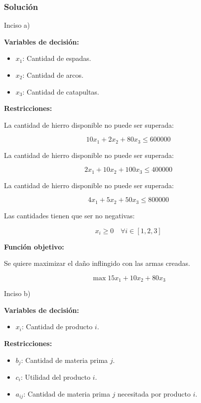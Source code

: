 \documentclass[a4paper,10pt,twocolumn]{article}
\theoremstyle{theorem}
\theoremstyle{definition}
\theoremstyle{remark}
\begin{document}
		\subsubsection{Solución}\label{subsubsec:sol_ejer_1}

Inciso a)

\textbf{Variables de decisión:}

\begin{itemize}
	\item $x_1$: Cantidad de espadas.
	\item $x_2$: Cantidad de arcos.
	\item $x_3$: Cantidad de catapultas.		
\end{itemize}

\textbf{Restricciones:}

La cantidad de hierro disponible no puede ser superada:

$$
10x_1 + 2x_2 + 80x_3 \le 600000
$$

La cantidad de hierro disponible no puede ser superada:

$$
2x_1 + 10x_2 + 100x_3 \le 400000
$$

La cantidad de hierro disponible no puede ser superada:

$$
4x_1 + 5x_2 + 50x_3 \le 800000
$$

Las cantidades tienen que ser no negativas:

$$
x_i \ge 0 \quad \forall i \in [1,2,3]
$$

\textbf{Función objetivo:}

Se quiere maximizar el daño inflingido con las armas creadas.

$$
\max 15 x_1 + 10 x_2 + 80 x_3
$$

Inciso b)

\textbf{Variables de decisión:}

\begin{itemize}
	\item $x_i$: Cantidad de producto $i$.
\end{itemize}

\textbf{Restricciones:}

\begin{itemize}
	\item $b_j$: Cantidad de materia prima $j$.
	\item $c_i$: Utilidad del producto $i$.
	\item $a_{ij}$: Cantidad de materia prima $j$ necesitada por producto $i$.
\end{itemize}
\end{document}
